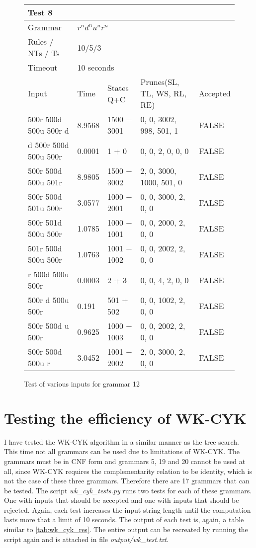 \begin{figure}[h]
\centering
  \caption{Test of various inputs for grammar 12}
  \label{tab:input_compl_test_8}
\begin{tabular}{ |l|l|l|l|l|  }
  \hline
  \multicolumn{5}{|l|}{Test 8} \\
  \hline
  Grammar & \multicolumn{4}{|l|}{$r^n d^n u^n r^n$} \\
  Rules / NTs / Ts & \multicolumn{4}{|l|}{10/5/3} \\
  Timeout & \multicolumn{4}{|l|}{10 seconds} \\
  \hline
  Input & Time & States Q+C & Prunes(SL, TL, WS, RL, RE) & Accepted \\
  \hline
 500r 500d 500u 500r d & 8.9568 & 1500 + 3001 & 0, 0, 3002, 998, 501, 1 & FALSE \\
 d 500r 500d 500u 500r & 0.0001 & 1 + 0 & 0, 0, 2, 0, 0, 0 & FALSE \\
 500r 500d 500u 501r & 8.9805 & 1500 + 3002 & 2, 0, 3000, 1000, 501, 0 & FALSE \\
 500r 500d 501u 500r & 3.0577 & 1000 + 2001 & 0, 0, 3000, 2, 0, 0 & FALSE \\
 500r 501d 500u 500r & 1.0785 & 1000 + 1001 & 0, 0, 2000, 2, 0, 0 & FALSE \\
 501r 500d 500u 500r & 1.0763 & 1001 + 1002 & 0, 0, 2002, 2, 0, 0 & FALSE \\
 r 500d 500u 500r & 0.0003 & 2 + 3 & 0, 0, 4, 2, 0, 0 & FALSE \\
 500r d 500u 500r & 0.191 & 501 + 502 & 0, 0, 1002, 2, 0, 0 & FALSE \\
 500r 500d u 500r & 0.9625 & 1000 + 1003 & 0, 0, 2002, 2, 0, 0 & FALSE \\
 500r 500d 500u r & 3.0452 & 1001 + 2002 & 2, 0, 3000, 2, 0, 0 & FALSE \\

  \hline
\end{tabular}
\end{figure}


\section{Testing the efficiency of WK-CYK}

I have tested the WK-CYK algorithm in a similar manner as the tree search. This time not all grammars can be used due to limitations of WK-CYK. The grammars must be in CNF form and grammars 5, 19 and 20 cannot be used at all, since WK-CYK requires the complementarity relation to be identity, which is not the case of these three grammars. Therefore there are 17 grammars that can be tested. The script \textit{wk\_cyk\_tests.py} runs two tests for each of these grammars. One with inputs that should be accepted and one with inputs that should be rejected. Again, each test increases the input string length until the computation lasts more that a limit of 10 seconds. The output of each test is, again, a table similar to \ref{tab:wk_cyk_res}. The entire output can be recreated by running the script again and is attached in file \textit{output/wk\_test.txt}.


